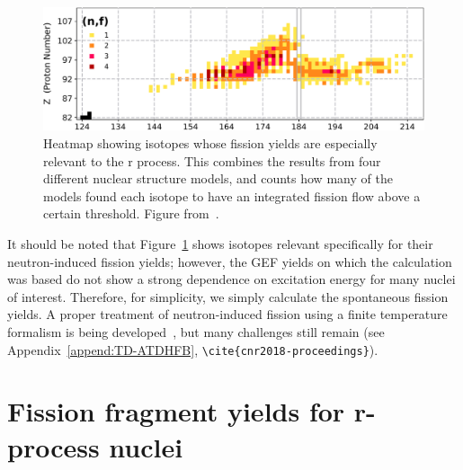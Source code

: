 \begin{figure}
	\centering
	\includegraphics[width=0.7\linewidth]{TeX_files/rProc_important-fissions}
	\caption[Heatmap showing isotopes whose fission yields are especially relevant to the r process. This combines the results from four different nuclear structure models, and counts how many of the models found each isotope to have an integrated fission flow above a certain threshold.]{Heatmap showing isotopes whose fission yields are especially relevant to the r process. This combines the results from four different nuclear structure models, and counts how many of the models found each isotope to have an integrated fission flow above a certain threshold. Figure from~\cite{Vassh2019}.}
	\label{fig:rprocimportant-fissions}
\end{figure}

It should be noted that Figure~\ref{fig:rprocimportant-fissions} shows isotopes relevant specifically for their neutron-induced fission yields; however, the GEF yields on which the calculation was based do not show a strong dependence on excitation energy for many nuclei of interest. Therefore, for simplicity, we simply calculate the spontaneous fission yields. A proper treatment of neutron-induced fission using a finite temperature formalism is being developed~\cite{Mcdonnell2014, Schunck2014, Schunck2015b}, but many challenges still remain (see Appendix~\ref{append:TD-ATDHFB}, \verb|\cite{cnr2018-proceedings}|).


\section{Fission fragment yields for r-process nuclei}

